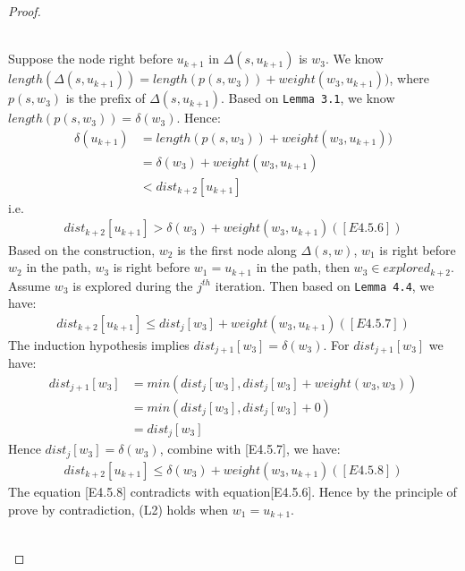 \begin{proof}
\begin{itemize}
\begin{enumerate}
  \\
  Suppose the node right before $u_{k+1}$ in $\Delta(s, u_{k+1})$ is $w_3$. We know $length(\Delta(s, u_{k+1})) = length(p(s, w_3)) + weight(w_3, u_{k+1}))$, where $p(s, w_3)$ is the prefix of $\Delta(s, u_{k+1})$. Based on \texttt{Lemma 3.1}, we know $length(p(s, w_3)) = \delta(w_3)$. Hence: 
  \begin{align*}
    \delta(u_{k+1}) &= length(p(s, w_3)) + weight(w_3, u_{k+1})) \\
                    &= \delta(w_3) + weight(w_3, u_{k+1}) \\
                    &< dist_{k+2}[u_{k+1}]
  \end{align*}
  i.e.
  \begin{align*}
    dist_{k+2}[u_{k+1}] > \delta(w_3) + weight(w_3, u_{k+1}) ([E4.5.6])
  \end{align*}
  Based on the construction, $w_2$ is the first node along $\Delta(s,w)$, $w_1$ is right before $w_2$ in the path, $w_3$ is right before $w_1 = u_{k+1}$ in the path, then $w_3 \in explored_{k+2}$. Assume $w_3$ is explored during the $j^{th}$ iteration. Then based on \texttt{Lemma 4.4}, we have: 
  \begin{align*}
    dist_{k+2}[u_{k+1}] \leq dist_j[w_3] + weight(w_3, u_{k+1}) ([E4.5.7])
  \end{align*}
  The induction hypothesis implies $dist_{j+1}[w_3] = \delta(w_3)$. For $dist_{j+1}[w_3]$ we have: 
  \begin{align*}
    dist_{j+1}[w_3] &= min(dist_j[w_3], dist_j[w_3] + weight(w_3, w_3)) \\
                   &= min(dist_j[w_3], dist_j[w_3] + 0) \\
                   &= dist_j[w_3]
  \end{align*}
  Hence $dist_j[w_3] = \delta(w_3)$, combine with [E4.5.7], we have: 
  \begin{align*}
    dist_{k+2}[u_{k+1}] \leq \delta(w_3) + weight(w_3, u_{k+1}) ([E4.5.8])
  \end{align*}
  The equation [E4.5.8] contradicts with equation[E4.5.6]. Hence by the principle of prove by contradiction, (L2) holds when $w_1 = u_{k+1}$. 
  \\\\


\end{enumerate}
\end{itemize}
\end{proof}
